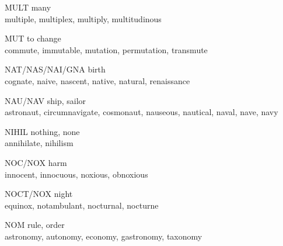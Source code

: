 \begin{flashcard}[Roots]{MULT}
many\\
\vspace{0.2in}
multiple, multiplex, multiply, multitudinous\\
\end{flashcard}

\begin{flashcard}[Roots]{MUT}
to change\\
\vspace{0.2in}
commute, immutable, mutation, permutation, transmute\\
\end{flashcard}

\begin{flashcard}[Roots]{NAT/NAS/NAI/GNA}
birth\\
\vspace{0.2in}
cognate, naive, nascent, native, natural, renaissance\\
\end{flashcard}

\begin{flashcard}[Roots]{NAU/NAV}
ship, sailor\\
\vspace{0.2in}
astronaut, circumnavigate, cosmonaut, nauseous, nautical, naval, nave, navy\\
\end{flashcard}

\begin{flashcard}[Roots]{NIHIL}
nothing, none\\
\vspace{0.2in}
annihilate, nihilism\\
\end{flashcard}

\begin{flashcard}[Roots]{NOC/NOX}
harm\\
\vspace{0.2in}
innocent, innocuous, noxious, obnoxious\\
\end{flashcard}

\begin{flashcard}[Roots]{NOCT/NOX}
night\\
\vspace{0.2in}
equinox, notambulant, nocturnal, nocturne\\
\end{flashcard}

\begin{flashcard}[Roots]{NOM}
rule, order\\
\vspace{0.2in}
astronomy, autonomy, economy, gastronomy, taxonomy\\
\end{flashcard}

